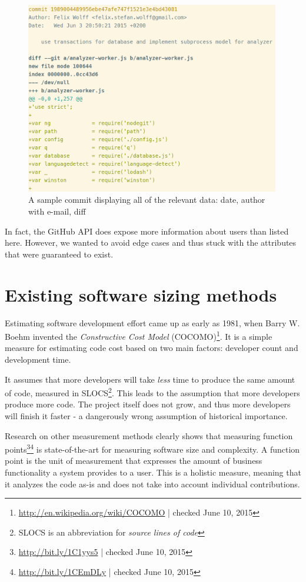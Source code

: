 \begin{figure}
    \includegraphics[width=30em]{gfx/commit.png}
    \caption{A sample commit displaying all of the relevant data: date, author with e-mail, diff}
    \label{fig:commit}
\end{figure}

In fact, the GitHub API does expose more information about users than listed here. However, we wanted
to avoid edge cases and thus stuck with the attributes that were guaranteed to exist.

\section{Existing software sizing methods}
Estimating software development effort came up as early as 1981, when Barry W. Boehm invented the \textit{Constructive Cost Model} (COCOMO)\footnote{\url{http://en.wikipedia.org/wiki/COCOMO} | checked June 10, 2015}.
It is a simple measure for estimating code cost based on two main factors: developer count and development time.
\newline

It assumes that more developers will take \textit{less} time to produce the same amount of code, measured in SLOCS\footnote{SLOCS is an abbreviation for \textit{source lines of code}}. This leads to the assumption that more developers produce more code. The project itself does not grow, and thus more developers will finish it faster - a dangerously wrong assumption of historical importance\cite{fb:1975}.
\newline

Research on other measurement methods clearly shows that measuring function points\footnote{\url{http://bit.ly/1C1yys5} | checked June 10, 2015}\footnote{\url{http://bit.ly/1CEmDLy} | checked June 10, 2015} is state-of-the-art for measuring software size and complexity\cite{linkedin:functionpointstandard}.
A function point is the unit of measurement that expresses the amount of business functionality a system provides to a user. This is a holistic measure, meaning that it analyzes the code as-is and does not take into account individual contributions.

